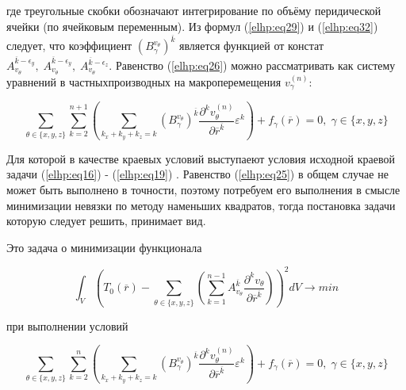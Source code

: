 где треугольные скобки обозначают интегрирование по объёму перидической ячейки (по ячейковым переменным). Из формул 
(\ref{elhp:eq29})
и 
(\ref{elhp:eq32})
следует, что коэффициент 
$\left( B_{\gamma}^{v_{\theta}} \right)^{ \overline{k} }$ 
является функцией от констат 
$A_{v_{\theta}}^{ \overline{k} - \epsilon_y} ,\;A_{v_{\theta}}^{ \overline{k} - \epsilon_y} ,\;A_{v_{\theta}}^{ \overline{k} - \epsilon_z}$. 
Равенство 
(\ref{elhp:eq26})
можно рассматривать как систему уравнений в частныхпроизводных на 
макроперемещения 
$v_{\gamma}^{(n)}$:

\begin{equation}
    \label{elhp:eq33}
    \sum_{ \theta \in \{x,y,z\} } \sum_{k=2}^{n+1}
    \left( 
        \sum_{k_x+k_y+k_z = k}
        \left( B_{\gamma}^{v_{\theta}} \right)^{ \overline{k} }
        \frac{\partial^k v_{\theta}^{(n)}}{\partial \overline{r}^{ \overline{k}}}
        \varepsilon^k
    \right) 
    + f_{ \gamma} \left( \overline{r}  \right) = 0
    ,\;
    \gamma \in \{x,y,z\} 
\end{equation}

Для которой в качестве краевых условий выступаеют условия исходной краевой задачи 
(\ref{elhp:eq16})
-
(\ref{elhp:eq19})
. Равенство 
(\ref{elhp:eq25})
в общем случае не может быть выполнено 
в точности, поэтому потребуем его выполнения в смысле минимизации невязки по методу наменьших квадратов, тогда постановка задачи которую следует
решить, принимает вид.

Это задача о минимизации функционала

\begin{equation}
    \label{elhp:eq34}
    \int_V \left( 
    T_0 \left( \overline{r}  \right) - 
    \sum_{ \theta \in \{x,y,z\} } \left( 
        \sum^{n-1}_{k=1} A_{v_{\theta}}^{ \overline{k} } \frac{\partial^k v_{\theta}}{\partial \overline{r}^{ \overline{k} } } 
    \right)   \right)^2
    dV \rightarrow min
\end{equation}

при выполнении условий

\begin{equation}
    \label{elhp:eq35}
    \sum_{ \theta \in \{x,y,z\} } \sum_{k=2}^{n}
    \left( 
        \sum_{k_x+k_y+k_z = k}
        \left( B_{\gamma}^{v_{\theta}} \right)^{ \overline{k} }
        \frac{\partial^k v_{\theta}^{(n)}}{\partial \overline{r}^{ \overline{k}}}
        \varepsilon^k
    \right) 
    + f_{ \gamma} \left( \overline{r}  \right) = 0
    ,\;
    \gamma \in \{x,y,z\} 
\end{equation}

